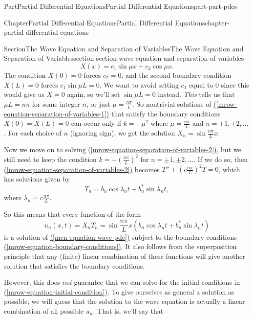 \documentclass[twoside,10pt,]{book}
\newcommand{\xreffont}{\relax}
\numberwithin{equation}{part}
\begin{document}
\begin{partptx}{Part}{Partial Differential Equations}{}{Partial Differential Equations}{}{}{part-part-pdes}
\begin{chapterptx}{Chapter}{Partial Differential Equations}{}{Partial Differential Equations}{}{}{chapter-partial-differential-equations}
\begin{sectionptx}{Section}{The Wave Equation and Separation of Variables}{}{The Wave Equation and Separation of Variables}{}{}{section-section-wave-equation-and-separation-of-variables}
%
\begin{equation*}
X(x) = c_{1}\sin\mu x + c_{2}\cos \mu x.
\end{equation*}
The condition \(X(0) = 0\) forces \(c_{2} = 0\), and the second boundary condition \(X(L) = 0\) forces \(c_{1}\sin \mu L = 0\). We want to avoid setting \(c_{1}\) equal to \(0\) since this would give us \(X=0\) again, so we'll set \(\sin \mu L= 0\) instead. \emph{This} tells us that \(\mu L = n\pi\) for some integer \(n\), or just \(\mu = \frac{n\pi}{L}\). So nontrivial solutions of \hyperref[mrow-equation-separation-of-variables-1]{({\xreffont\ref{mrow-equation-separation-of-variables-1}})} that satisfy the boundary conditions \(X(0)=X(L) = 0\) can occur only if \(k = -\mu^{2}\) where \(\mu = \frac{n\pi}{L}\) and \(n=\pm1,\pm2,\ldots\). For each choice of \(n\) (ignoring sign), we get the solution \(X_{n} = \sin\frac{n\pi}{L}x\).%
\par
Now we move on to solving \hyperref[mrow-equation-separation-of-variables-2]{({\xreffont\ref{mrow-equation-separation-of-variables-2}})}, but we still need to keep the condition \(k=-(\frac{n\pi}{L})^{2}\) for \(n=\pm1,\pm2,\ldots\). If we do so, then \hyperref[mrow-equation-separation-of-variables-2]{({\xreffont\ref{mrow-equation-separation-of-variables-2}})} becomes \(T''+(c\frac{n\pi}{L})^{2}T=0\), which has solutions given by%
\begin{equation*}
T_{n} = b_{n}\cos\lambda_{n}t+b^{*}_{n}\sin\lambda_{n}t,
\end{equation*}
where \(\lambda_{n} = c\frac{n\pi}{L}\).%
\par
So this means that every function of the form%
\begin{equation*}
u_{n}(x,t) = X_{n}T_{n} = \sin\frac{n\pi}{L}x\left(b_{n}\cos\lambda_{n}t+b^{*}_{n}\sin\lambda_{n}t\right)
\end{equation*}
is a solution of \hyperref[men-equation-wave-pde]{({\xreffont\ref{men-equation-wave-pde}})} subject to the boundary conditions \hyperref[mrow-equation-boundary-conditions]{({\xreffont\ref{mrow-equation-boundary-conditions}})}. It also follows from the superposition principle that any (finite) linear combination of these functions will give another solution that satisfies the boundary conditions.%
\par
However, this does \emph{not} guarantee that we can solve for the initial conditions in \hyperref[mrow-equation-initial-condition]{({\xreffont\ref{mrow-equation-initial-condition}})}. To give ourselves as general a solution as possible, we will guess that the solution to the wave equation is actually a linear combination of all possible \(u_{n}\). That is, we'll say that%

\end{sectionptx}
\end{chapterptx}
\end{partptx}
\end{document}
